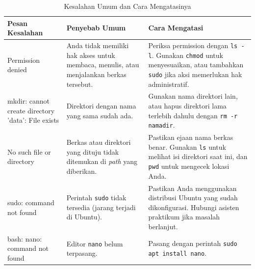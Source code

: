 \begin{table}[H]
	\caption{Kesalahan Umum dan Cara Mengatasinya}
	\label{tab:m03-troubleshooting}
	\small
	\begin{tabularx}{\textwidth}{|>{{\ttfamily\small}}X|X|X|}
		\hline
		\normalfont\textbf{Pesan Kesalahan} & \textbf{Penyebab Umum} & \textbf{Cara Mengatasi} \\ \hline
		Permission denied & Anda tidak memiliki hak akses untuk membaca, menulis, atau menjalankan berkas tersebut. & Periksa permission dengan \texttt{ls -l}. Gunakan \texttt{chmod} untuk menyesuaikan, atau tambahkan \texttt{sudo} jika aksi memerlukan hak administratif. \\ \hline
		mkdir: cannot create directory 'data': File exists & Direktori dengan nama yang sama sudah ada. & Gunakan nama direktori lain, atau hapus direktori lama terlebih dahulu dengan \texttt{rm -r namadir}. \\ \hline
		No such file or directory & Berkas atau direktori yang dituju tidak ditemukan di \textit{path} yang diberikan. & Pastikan ejaan nama berkas benar. Gunakan \texttt{ls} untuk melihat isi direktori saat ini, dan \texttt{pwd} untuk mengecek lokasi Anda. \\ \hline
		sudo: command not found & Perintah \texttt{sudo} tidak tersedia (jarang terjadi di Ubuntu). & Pastikan Anda menggunakan distribusi Ubuntu yang sudah dikonfigurasi. Hubungi asisten praktikum jika masalah berlanjut. \\ \hline
		bash: nano: command not found & Editor \texttt{nano} belum terpasang. & Pasang dengan perintah \texttt{sudo apt install nano}. \\ \hline
	\end{tabularx}
\end{table}